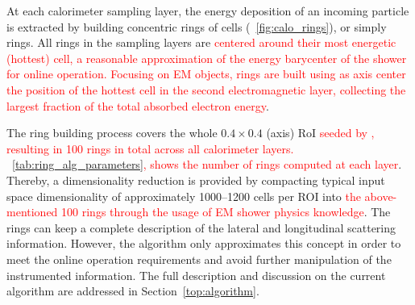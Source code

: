 At each calorimeter sampling layer, the energy deposition of an incoming particle is extracted by building concentric rings of cells (\figurename~\ref{fig:calo_rings}), or simply rings. All rings in the \ecal sampling layers are
\textcolor{red}{centered around their most energetic (hottest) cell, a reasonable
approximation of the energy barycenter of the shower for online
operation.  Focusing on EM objects, rings are built using as axis center the position of
the hottest cell in the second electromagnetic layer, collecting the largest
fraction of the total absorbed electron energy}.

The ring building process covers the whole $0.4\times0.4$ (\etaphi axis) RoI
\textcolor{red}{seeded by \licalo, resulting in 100 rings in total across all calorimeter layers.
\tablename~\ref{tab:ring_alg_parameters}, shows the number of rings computed at each layer}. Thereby, a dimensionality reduction is provided by compacting
typical input space dimensionality of approximately 1000--1200 cells per ROI into
\textcolor{red}{the above-mentioned 100 rings through the usage of EM shower physics knowledge}. The rings can keep a complete description of the lateral and
longitudinal scattering information. However, the algorithm only approximates this concept
in order to meet the online operation requirements and avoid further
manipulation of the instrumented information. The full description and
discussion on the current algorithm are addressed in
Section~\ref{top:algorithm}.



